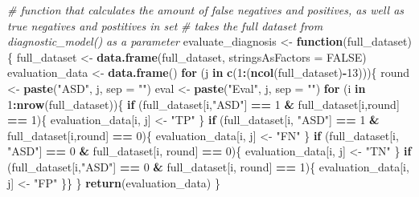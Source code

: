 \documentclass[]{article}
\newenvironment{Shaded}{\begin{snugshade}}{\end{snugshade}}
\newcommand{\KeywordTok}[1]{\textcolor[rgb]{0.13,0.29,0.53}{\textbf{#1}}}
\newcommand{\DataTypeTok}[1]{\textcolor[rgb]{0.13,0.29,0.53}{#1}}
\newcommand{\DecValTok}[1]{\textcolor[rgb]{0.00,0.00,0.81}{#1}}
\newcommand{\StringTok}[1]{\textcolor[rgb]{0.31,0.60,0.02}{#1}}
\newcommand{\CommentTok}[1]{\textcolor[rgb]{0.56,0.35,0.01}{\textit{#1}}}
\newcommand{\OtherTok}[1]{\textcolor[rgb]{0.56,0.35,0.01}{#1}}
\newcommand{\ControlFlowTok}[1]{\textcolor[rgb]{0.13,0.29,0.53}{\textbf{#1}}}
\newcommand{\OperatorTok}[1]{\textcolor[rgb]{0.81,0.36,0.00}{\textbf{#1}}}
\newcommand{\NormalTok}[1]{#1}
\begin{document}
\begin{Shaded}
\begin{Highlighting}[]
{{\CommentTok{# function that calculates the amount of false negatives and positives, as well as true negatives and postitives in set}
\CommentTok{# takes the full dataset from diagnostic_model() as a parameter}
\NormalTok{evaluate_diagnosis <-}\StringTok{ }\ControlFlowTok{function}\NormalTok{(full_dataset) \{}
\NormalTok{  full_dataset <-}\StringTok{ }\KeywordTok{data.frame}\NormalTok{(full_dataset, }\DataTypeTok{stringsAsFactors =} \OtherTok{FALSE}\NormalTok{)}
\NormalTok{  evaluation_data <-}\StringTok{ }\KeywordTok{data.frame}\NormalTok{()}
  \ControlFlowTok{for}\NormalTok{ (j }\ControlFlowTok{in} \KeywordTok{c}\NormalTok{(}\DecValTok{1}\OperatorTok{:}\NormalTok{(}\KeywordTok{ncol}\NormalTok{(full_dataset)}\OperatorTok{-}\DecValTok{13}\NormalTok{)))\{}
\NormalTok{    round <-}\StringTok{ }\KeywordTok{paste}\NormalTok{(}\StringTok{"ASD"}\NormalTok{, j, }\DataTypeTok{sep =} \StringTok{""}\NormalTok{)}
\NormalTok{    eval <-}\StringTok{ }\KeywordTok{paste}\NormalTok{(}\StringTok{"Eval"}\NormalTok{, j, }\DataTypeTok{sep =} \StringTok{""}\NormalTok{)}
    \ControlFlowTok{for}\NormalTok{ (i }\ControlFlowTok{in} \DecValTok{1}\OperatorTok{:}\KeywordTok{nrow}\NormalTok{(full_dataset))\{}
      \ControlFlowTok{if}\NormalTok{ (full_dataset[i,}\StringTok{"ASD"}\NormalTok{] }\OperatorTok{==}\StringTok{ }\DecValTok{1} \OperatorTok{&}\StringTok{ }\NormalTok{full_dataset[i,round] }\OperatorTok{==}\StringTok{ }\DecValTok{1}\NormalTok{)\{}
\NormalTok{        evaluation_data[i, j] <-}\StringTok{ "TP"}
\NormalTok{      \}}
      \ControlFlowTok{if}\NormalTok{ (full_dataset[i, }\StringTok{"ASD"}\NormalTok{] }\OperatorTok{==}\StringTok{ }\DecValTok{1} \OperatorTok{&}\StringTok{ }\NormalTok{full_dataset[i,round] }\OperatorTok{==}\StringTok{ }\DecValTok{0}\NormalTok{)\{}
\NormalTok{        evaluation_data[i, j] <-}\StringTok{ "FN"}
\NormalTok{      \}}
      \ControlFlowTok{if}\NormalTok{ (full_dataset[i, }\StringTok{"ASD"}\NormalTok{] }\OperatorTok{==}\StringTok{ }\DecValTok{0} \OperatorTok{&}\StringTok{ }\NormalTok{full_dataset[i, round] }\OperatorTok{==}\StringTok{ }\DecValTok{0}\NormalTok{)\{}
\NormalTok{        evaluation_data[i, j] <-}\StringTok{ "TN"}
\NormalTok{      \}}
      \ControlFlowTok{if}\NormalTok{ (full_dataset[i,}\StringTok{"ASD"}\NormalTok{] }\OperatorTok{==}\StringTok{ }\DecValTok{0} \OperatorTok{&}\StringTok{ }\NormalTok{full_dataset[i, round] }\OperatorTok{==}\StringTok{ }\DecValTok{1}\NormalTok{)\{}
\NormalTok{        evaluation_data[i, j] <-}\StringTok{ "FP"}
\NormalTok{      \}\}}
\NormalTok{  \}}
  \KeywordTok{return}\NormalTok{(evaluation_data)}
\NormalTok{\}}


}}
\end{Highlighting}
\end{Shaded}
\end{document}
